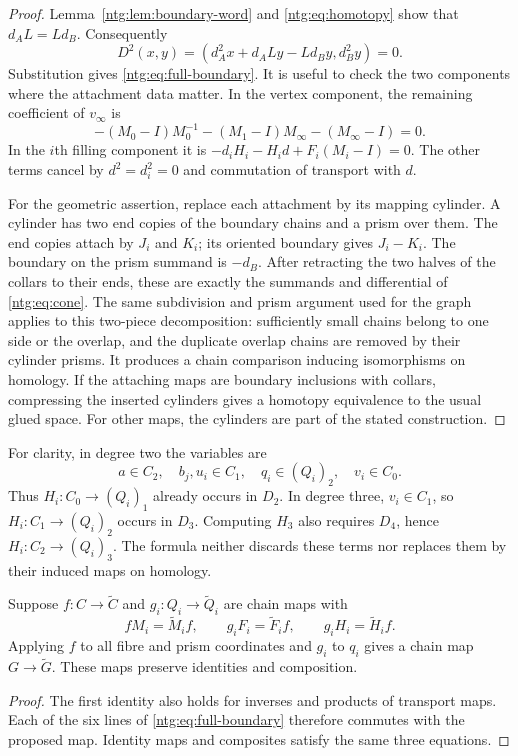 \begin{proof}
Lemma~\ref{ntg:lem:boundary-word} and \eqref{ntg:eq:homotopy} show that
$d_AL=Ld_B$. Consequently
\[
 D^2(x,y)=(d_A^2x+d_ALy-Ld_By,d_B^2y)=0.
\]
Substitution gives \eqref{ntg:eq:full-boundary}. It is useful to check the
two components where the attachment data matter. In the vertex
component, the remaining coefficient of $v_\infty$ is
\[
 -(M_0-I)M_0^{-1}-(M_1-I)M_\infty-(M_\infty-I)=0.
\]
In the $i$th filling component it is
$-d_iH_i-H_id+F_i(M_i-I)=0$. The other terms cancel by
$d^2=d_i^2=0$ and commutation of transport with $d$.

For the geometric assertion, replace each attachment by its mapping
cylinder. A cylinder has two end copies of the boundary chains and a
prism over them. The end copies attach by $J_i$ and $K_i$; its oriented
boundary gives $J_i-K_i$. The boundary on the prism summand is $-d_B$.
After retracting the two halves of the collars to their ends, these are
exactly the summands and differential of \eqref{ntg:eq:cone}.
The same subdivision and prism argument used for the graph applies
to this two-piece decomposition: sufficiently small chains belong to
one side or the overlap, and the duplicate overlap chains are removed
by their cylinder prisms. It produces a chain comparison inducing
isomorphisms on homology. If the attaching maps are boundary inclusions
with collars, compressing the inserted cylinders gives a homotopy
equivalence to the usual glued space. For other maps, the cylinders
are part of the stated construction.
\end{proof}

For clarity, in degree two the variables are
\[
 a\in C_2,\quad b_j,u_i\in C_1,\quad q_i\in(Q_i)_2,
 \quad v_i\in C_0.
\]
Thus $H_i:C_0\to(Q_i)_1$ already occurs in $D_2$. In degree three,
$v_i\in C_1$, so $H_i:C_1\to(Q_i)_2$ occurs in $D_3$.
Computing $H_3$ also requires $D_4$, hence
$H_i:C_2\to(Q_i)_3$. The formula neither discards these terms nor
replaces them by their induced maps on homology.

\begin{proposition}\label{ntg:prop:natural}
Suppose $f:C\to\widetilde C$ and $g_i:Q_i\to\widetilde Q_i$ are
chain maps with
\[
 fM_i=\widetilde M_if,\qquad
 g_iF_i=\widetilde F_if,\qquad
 g_iH_i=\widetilde H_if.
\]
Applying $f$ to all fibre and prism coordinates and $g_i$ to $q_i$
gives a chain map $G\to\widetilde G$. These maps preserve identities
and composition.
\end{proposition}
\begin{proof}
The first identity also holds for inverses and products of transport
maps. Each of the six lines of \eqref{ntg:eq:full-boundary} therefore
commutes with the proposed map. Identity maps and composites satisfy
the same three equations.
\end{proof}


